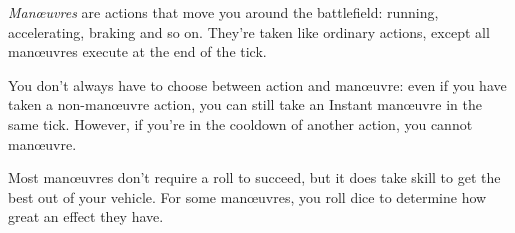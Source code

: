 
\emph{Man\oe{}uvres} are actions that move you around the battlefield: running, accelerating, braking and so on. They're taken like ordinary actions, except all man\oe{}uvres execute at the end of the tick.

You don't always have to choose between action and man\oe{}uvre: even if you have taken a non-man\oe{}uvre action, you can still take an Instant man\oe{}uvre in the same tick. However, if you're in the cooldown of another action, you cannot man\oe{}uvre.

Most man\oe{}uvres don't require a roll to succeed, but it does take skill to get the best out of your vehicle. For some man\oe{}uvres, you roll dice to determine how great an effect they have.
